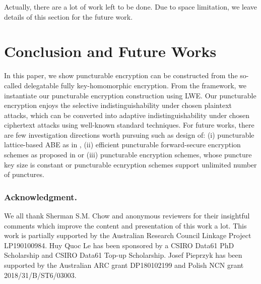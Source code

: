 \documentclass[runningheads,10pt]{llncs}
\begin{document}
Actually, there are a lot of work left to be done. Due to space limitation, we leave details of this section for the future work.

\section{Conclusion and Future Works} \label{conclude}
In this paper, we show puncturable encryption can be constructed from the so-called delegatable fully key-homomorphic encryption.
From the framework, we instantiate our puncturable encryption construction using LWE. 
Our puncturable encryption enjoys the selective indistinguishability under chosen plaintext attacks, 
which can be converted into adaptive indistinguishability under chosen ciphertext attacks using well-known standard techniques.
For future works, there are few investigation directions worth pursuing such as design of:
(i) puncturable lattice-based ABE as in \cite{PNXW18},
(ii) efficient puncturable forward-secure encryption schemes as proposed in\cite{GM15} or 
(iii) puncturable encryption schemes, whose  puncture key size is constant or puncturable ecnryption schemes support unlimited number of punctures.

\subsubsection{Acknowledgment.} 
We all thank  Sherman S.M. Chow and anonymous reviewers for their insightful comments which improve the content and presentation of  this work a lot.  This work is partially supported by the Australian Research Council Linkage Project LP190100984. Huy Quoc Le has been sponsored by a CSIRO Data61 PhD Scholarship and CSIRO Data61 Top-up Scholarship.  Josef Pieprzyk has been supported by the Australian ARC grant DP180102199 and Polish NCN grant 2018/31/B/ST6/03003. 
\end{document}
